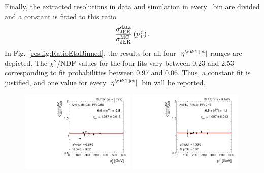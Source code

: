 Finally, the extracted resolutions in data and simulation in every \ptgamma~bin are divided and a constant is fitted to this ratio
\begin{equation}
\frac{\sigma_\mathrm{JER}^{\text{data}}}{\sigma_\mathrm{JER}^{\text{MC}}} \left( p_{\text{T}}^{\gamma} \right).
\end{equation}
In Fig.~\ref{res:fig:RatioEtaBinned}, the results for all four $|\etafirstjet|$-ranges are depicted. 
The $\chi^2$/NDF-values for the four fits vary between 0.23 and 2.53 corresponding to fit probabilities between 0.97 and 0.06. 
Thus, a constant fit is justified, and one value for every $|\etafirstjet|$~bin will be reported.

\begin{figure}[!t]
 \centering
    \includegraphics[width=0.49\textwidth]{figures/resolution/results/Ratio_Resolution_for_1_eta_bin_PFCHS_data_comparison_RMS99.pdf}
    \includegraphics[width=0.49\textwidth]{figures/resolution/results/Ratio_Resolution_for_2_eta_bin_PFCHS_data_comparison_RMS99.pdf}
    \vspace{18pt}


\end{figure}
